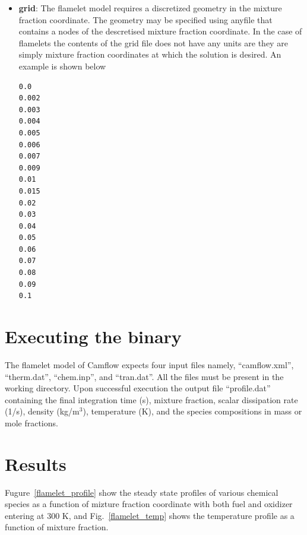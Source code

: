 \begin{itemize}
\item \textbf{grid}: The flamelet model requires a discretized geometry in the mixture fraction coordinate. The geometry may be specified using anyfile that contains a nodes of the descretised mixture fraction coordinate. In the case of flamelets the contents of the grid file does not have any units are they are simply mixture fraction coordinates at which the solution is desired. An example is shown below\\
{\scriptsize{\begin{verbatim}
0.0
0.002
0.003
0.004
0.005
0.006
0.007
0.009
0.01
0.015
0.02
0.03
0.04
0.05
0.06
0.07
0.08
0.09
0.1
\end{verbatim}
}}

\end{itemize}

\section{Executing the binary}
The flamelet model of Camflow expects four input files namely, ``camflow.xml'', ``therm.dat'',  ``chem.inp'', and ``tran.dat''. All the files must be present in the working directory. Upon successful execution the output file ``profile.dat'' containing the final integration time (s), mixture fraction, scalar dissipation rate (1/s), density (kg/m$^3$), temperature (K), and the species compositions in mass or mole fractions.

\section{Results}
Fugure~\ref{flamelet_profile} show the steady state profiles of various chemical species as a function of mizture fraction coordinate with both fuel and oxidizer entering at 300 K, and Fig.~\ref{flamelet_temp} shows the temperature profile as a function of mixture fraction.

